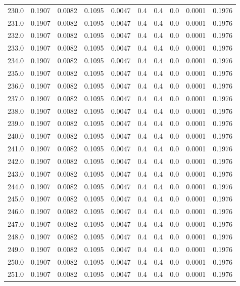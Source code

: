 \begin{longtable}{lrrrrrrrrr}
230.0 & 0.1907 & 0.0082 & 0.1095 & 0.0047 & 0.4 & 0.4 & 0.0 & 0.0001 & 0.1976 \\
231.0 & 0.1907 & 0.0082 & 0.1095 & 0.0047 & 0.4 & 0.4 & 0.0 & 0.0001 & 0.1976 \\
232.0 & 0.1907 & 0.0082 & 0.1095 & 0.0047 & 0.4 & 0.4 & 0.0 & 0.0001 & 0.1976 \\
233.0 & 0.1907 & 0.0082 & 0.1095 & 0.0047 & 0.4 & 0.4 & 0.0 & 0.0001 & 0.1976 \\
234.0 & 0.1907 & 0.0082 & 0.1095 & 0.0047 & 0.4 & 0.4 & 0.0 & 0.0001 & 0.1976 \\
235.0 & 0.1907 & 0.0082 & 0.1095 & 0.0047 & 0.4 & 0.4 & 0.0 & 0.0001 & 0.1976 \\
236.0 & 0.1907 & 0.0082 & 0.1095 & 0.0047 & 0.4 & 0.4 & 0.0 & 0.0001 & 0.1976 \\
237.0 & 0.1907 & 0.0082 & 0.1095 & 0.0047 & 0.4 & 0.4 & 0.0 & 0.0001 & 0.1976 \\
238.0 & 0.1907 & 0.0082 & 0.1095 & 0.0047 & 0.4 & 0.4 & 0.0 & 0.0001 & 0.1976 \\
239.0 & 0.1907 & 0.0082 & 0.1095 & 0.0047 & 0.4 & 0.4 & 0.0 & 0.0001 & 0.1976 \\
240.0 & 0.1907 & 0.0082 & 0.1095 & 0.0047 & 0.4 & 0.4 & 0.0 & 0.0001 & 0.1976 \\
241.0 & 0.1907 & 0.0082 & 0.1095 & 0.0047 & 0.4 & 0.4 & 0.0 & 0.0001 & 0.1976 \\
242.0 & 0.1907 & 0.0082 & 0.1095 & 0.0047 & 0.4 & 0.4 & 0.0 & 0.0001 & 0.1976 \\
243.0 & 0.1907 & 0.0082 & 0.1095 & 0.0047 & 0.4 & 0.4 & 0.0 & 0.0001 & 0.1976 \\
244.0 & 0.1907 & 0.0082 & 0.1095 & 0.0047 & 0.4 & 0.4 & 0.0 & 0.0001 & 0.1976 \\
245.0 & 0.1907 & 0.0082 & 0.1095 & 0.0047 & 0.4 & 0.4 & 0.0 & 0.0001 & 0.1976 \\
246.0 & 0.1907 & 0.0082 & 0.1095 & 0.0047 & 0.4 & 0.4 & 0.0 & 0.0001 & 0.1976 \\
247.0 & 0.1907 & 0.0082 & 0.1095 & 0.0047 & 0.4 & 0.4 & 0.0 & 0.0001 & 0.1976 \\
248.0 & 0.1907 & 0.0082 & 0.1095 & 0.0047 & 0.4 & 0.4 & 0.0 & 0.0001 & 0.1976 \\
249.0 & 0.1907 & 0.0082 & 0.1095 & 0.0047 & 0.4 & 0.4 & 0.0 & 0.0001 & 0.1976 \\
250.0 & 0.1907 & 0.0082 & 0.1095 & 0.0047 & 0.4 & 0.4 & 0.0 & 0.0001 & 0.1976 \\
251.0 & 0.1907 & 0.0082 & 0.1095 & 0.0047 & 0.4 & 0.4 & 0.0 & 0.0001 & 0.1976 \\

\end{longtable}
